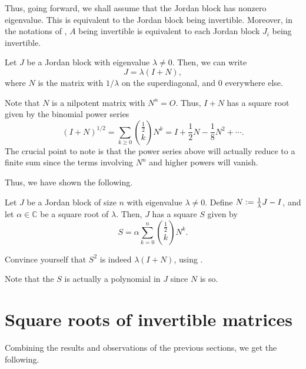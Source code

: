 \documentclass[12pt]{article}
\begin{document}
Thus, going forward, we shall assume that the Jordan block has nonzero eigenvalue. This is equivalent to the Jordan block being invertible. Moreover, in the notations of , $A$ being invertible is equivalent to each Jordan block $J_{i}$ being invertible.

Let $J$ be a Jordan block with eigenvalue $\lambda \neq 0$. Then, we can write
\begin{equation*} 
	J = \lambda(I + N),
\end{equation*}
where $N$ is the matrix with $1/\lambda$ on the superdiagonal, and $0$ everywhere else.

Note that $N$ is a nilpotent matrix with $N^{n} = O$. Thus, $I + N$ has a square root given by the binomial power series
\begin{equation*} 
	(I + N)^{1/2} = \sum_{k \ge 0} \binom{\frac{1}{2}}{k} N^{k} = I + \frac{1}{2} N - \frac{1}{8} N^{2} + \cdots.
\end{equation*}
The crucial point to note is that the power series above will actually reduce to a finite sum since the terms involving $N^{n}$ and higher powers will vanish.

Thus, we have shown the following.
\begin{thm} \label{thm:square-root-jordan}
	Let $J$ be a Jordan block of size $n$ with eigenvalue $\lambda \neq 0$. Define $N \vcentcolon= \frac{1}{\lambda} J - I$, and let $\alpha \in \mathbb{C}$ be a square root of $\lambda$. Then, $J$ has a square $S$ given by
	\begin{equation} \label{eq:02}
		S = \alpha \sum_{k = 0}^{n} \binom{\frac{1}{2}}{k} N^{k}.
	\end{equation}
\end{thm}

\begin{exe}
	Convince yourself that $S^{2}$ is indeed $\lambda(I + N)$, using .
\end{exe}

\begin{obs} \label{obs:polynomial-jordan-root}
	Note that the $S$ is actually a polynomial in $J$ since $N$ is so.
\end{obs}

\section{Square roots of invertible matrices}

Combining the results and observations of the previous sections, we get the following.
\end{document}
